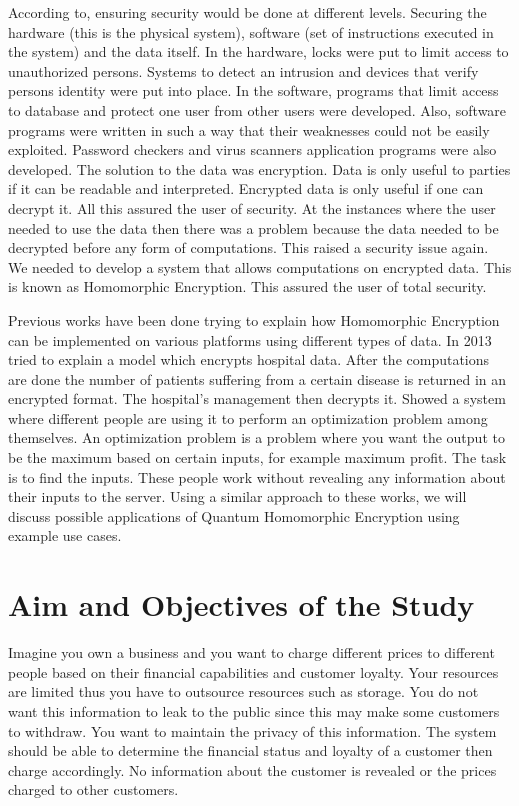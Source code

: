 According to, ensuring security would be done at different levels. Securing the hardware (this is the physical system), software (set of instructions executed in the system) and the data itself. In the hardware, locks were put to limit access to unauthorized persons. Systems to detect an intrusion and devices that verify persons identity were put into place. In the software, programs that limit access to database and protect one user from other users were developed. Also, software programs were written in such a way that their weaknesses could not be easily exploited. Password checkers and virus scanners application programs were also developed. The solution to the data was encryption. Data is only useful to parties if it can be readable and interpreted. Encrypted data is only useful if one can decrypt it.  All this assured the user of security. At the instances where the user needed to use the data then there was a problem because the data needed to be decrypted before any form of computations. This raised a security issue again. We needed to develop a system that allows computations on encrypted data. This is known as Homomorphic Encryption. This assured the user of total security. 

Previous works have been done trying to explain how Homomorphic Encryption can be implemented on various platforms using different types of data. In 2013  tried to explain a model which encrypts hospital data. After the computations are done the number of patients suffering from a certain disease is returned in an encrypted format. The hospital's management then decrypts it. Showed a system where different people are using it to perform an optimization problem among themselves. An optimization problem is a problem where you want the output to be the maximum based on certain inputs, for example maximum profit. The task is to find the inputs. These people work without revealing any information about their inputs to the server. Using a similar approach to these works, we will discuss possible applications of Quantum Homomorphic Encryption using example use cases.


\section{Aim and Objectives of the Study}
Imagine you own a business and you want to charge different prices to different people based on their financial capabilities and customer loyalty. Your resources are limited thus you have to outsource resources such as storage. You do not want this information to leak to the public since this may make some customers to withdraw. You want to maintain the privacy of this information. The system should be able to determine the financial status and loyalty of a customer then charge accordingly. No information about the customer is revealed or the prices charged to other customers.

